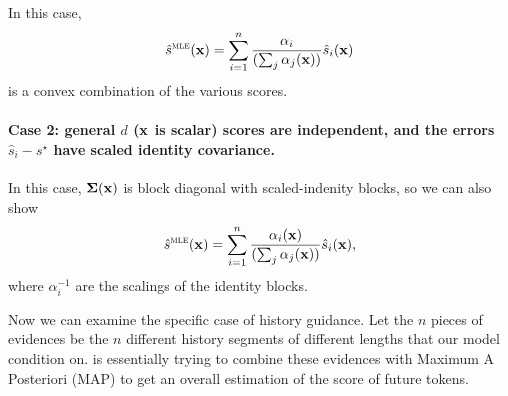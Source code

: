 In this case,     \begin{align}
    \hat s^{\textsc{mle}}({\mathbf{x}}) = \sum_{i=1}^n \frac{\alpha_i}{(\sum_{j}\alpha_j({\mathbf{x}}))}\hat{{s}}_i({\mathbf{x}})
\end{align}
is a convex combination of the various scores. 

\paragraph{Case 2: general $d$ (${\mathbf{x}}$ is scalar) scores are independent, and the errors $\hat{s}_i - s^\star$ have scaled identity covariance.} In this case, $\bm{\Sigma}({\mathbf{x}})$ is block diagonal with scaled-indenity blocks, so we can also show 
  \begin{align}
    \hat s^{\textsc{mle}}({\mathbf{x}}) = \sum_{i=1}^n \frac{\alpha_i({\mathbf{x}})}{(\sum_{j}\alpha_j({\mathbf{x}}))}\hat{{s}}_i({\mathbf{x}}),
\end{align}
where $\alpha_i^{-1}$ are the scalings of the identity blocks. 














Now we can examine the specific case of history guidance. Let the $n$ pieces of evidences be the $n$ different history segments of different lengths that our model condition on. \method is essentially trying to combine these evidences with Maximum A Posteriori (MAP) to get an overall estimation of the score of future tokens.


